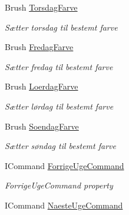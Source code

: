 \begin{DoxyCompactItemize}
Brush \hyperlink{class__1aarsproeve_1_1_view_model_1_1_vagtplan_view_model_a88d17bbfb35c27d773321581f4cfd5df}{Torsdag\+Farve}
\begin{DoxyCompactList}\small\item\em Sætter torsdag til bestemt farve \end{DoxyCompactList}\item 
Brush \hyperlink{class__1aarsproeve_1_1_view_model_1_1_vagtplan_view_model_a77eb2c412d3a8adb1a46aad714bae471}{Fredag\+Farve}
\begin{DoxyCompactList}\small\item\em Sætter fredag til bestemt farve \end{DoxyCompactList}\item 
Brush \hyperlink{class__1aarsproeve_1_1_view_model_1_1_vagtplan_view_model_a185e3bddfb80d3f012af638b27bbf99a}{Loerdag\+Farve}
\begin{DoxyCompactList}\small\item\em Sætter lørdag til bestemt farve \end{DoxyCompactList}\item 
Brush \hyperlink{class__1aarsproeve_1_1_view_model_1_1_vagtplan_view_model_aa6afb148e3e73f41c510862b157affb0}{Soendag\+Farve}
\begin{DoxyCompactList}\small\item\em Sætter søndag til bestemt farve \end{DoxyCompactList}\item 
I\+Command \hyperlink{class__1aarsproeve_1_1_view_model_1_1_vagtplan_view_model_a0b3b612ac629f20f80c28bc6560da7a1}{Forrige\+Uge\+Command}
\begin{DoxyCompactList}\small\item\em Forrige\+Uge\+Command property \end{DoxyCompactList}\item 
I\+Command \hyperlink{class__1aarsproeve_1_1_view_model_1_1_vagtplan_view_model_a4f463fb1507859004e80b064e43bfeaf}{Naeste\+Uge\+Command}

\end{DoxyCompactItemize}

